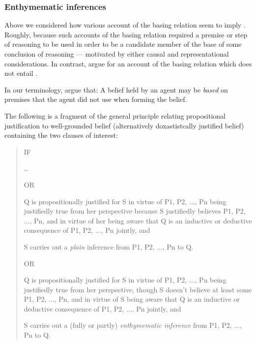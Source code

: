 \subsubsection{Enthymematic inferences}

\begin{note}
  Above we considered how various account of the basing relation seem to imply \ESU{}.
  Roughly, because such accounts of the basing relation required a premise or step of reasoning to be used in order to be a candidate member of the base of some conclusion of reasoning --- motivated by either causal and representational considerations.
  In contrast, \citeauthor{Moretti:2019wx} argue for an account of the basing relation which does not entail \ESU{}.

  In our terminology, \citeauthor{Moretti:2019wx} argue that: A belief held by an agent may be \emph{based} on premises that the agent did not use when forming the belief.

  The following is a fragment of the general principle relating propositional justification to well-grounded belief (alternatively doxastistcally justified belief) containing the two clauses of interest:

  \begin{quote}
    IF

    \dots

    OR

    \begin{enumerate*}[label=(\arabic*.2\(^{\ast}\))]
    \item\label{LT:1.2} Q is propositionally justified for S in virtue of P1, P2, \(\dots\), Pn being justifiedly true from her perspective because S justifiedly believes P1, P2, \(\dots\), Pn, and in virtue of her being aware that Q is an inductive or deductive consequence of P1, P2, \(\dots\), Pn jointly, and
    \item\label{LT:2.2} S carries out a \emph{plain} inference from P1, P2, \(\dots\), Pn to Q.
    \end{enumerate*}

    OR

    \begin{enumerate*}[label=(\arabic*.3), ref=(\arabic*.3)]
    \item\label{LT:1.3} Q is propositionally justified for S in virtue of P1, P2, \(\dots\), Pn being justifiedly true from her perspective, though S doesn't believe at least some P1, P2, \(\dots\), Pn, and in virtue of S being aware that Q is an inductive or deductive consequence of P1, P2, \(\dots\), Pn jointly, and
    \item\label{LT:2.3} S carries out a (fully or partly) \emph{enthymematic inference} from P1, P2, \(\dots\), Pn to Q.
    \end{enumerate*}


\end{quote}
\end{note}
